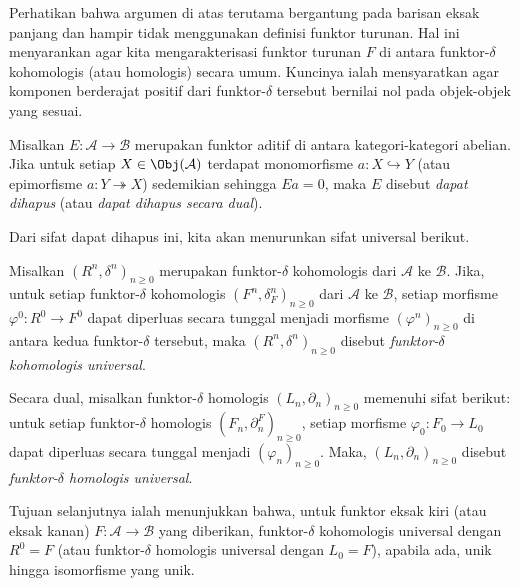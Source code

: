 Perhatikan bahwa argumen di atas terutama bergantung pada barisan eksak panjang dan hampir tidak menggunakan definisi funktor turunan. Hal ini menyarankan agar kita mengarakterisasi funktor turunan $F$ di antara funktor-$\delta$ kohomologis (atau homologis) secara umum. Kuncinya ialah mensyaratkan agar komponen berderajat positif dari funktor-$\delta$ tersebut bernilai nol pada objek-objek yang sesuai.

\begin{definisi}[A.\ Grothendieck]\label{def:erasable}
	Misalkan $E: \mathcal{A} \to \mathcal{B}$ merupakan funktor aditif di antara kategori-kategori abelian. Jika untuk setiap $X \in \Obj(\mathcal{A})$ terdapat monomorfisme $a: X \hookrightarrow Y$ (atau epimorfisme $a: Y \twoheadrightarrow X$) sedemikian sehingga $Ea = 0$, maka $E$ disebut \emph{dapat dihapus} (atau \emph{dapat dihapus secara dual}).
\end{definisi}

Dari sifat dapat dihapus ini, kita akan menurunkan sifat universal berikut.

\begin{definisi}\label{def:universal-delta-functor}
	Misalkan $(R^n, \delta^n)_{n \geq 0}$ merupakan funktor-$\delta$ kohomologis dari $\mathcal{A}$ ke $\mathcal{B}$. Jika, untuk setiap funktor-$\delta$ kohomologis $(F^n, \delta_F^n)_{n \geq 0}$ dari $\mathcal{A}$ ke $\mathcal{B}$, setiap morfisme $\varphi^0: R^0 \to F^0$ dapat diperluas secara tunggal menjadi morfisme $(\varphi^n)_{n \geq 0}$ di antara kedua funktor-$\delta$ tersebut, maka $(R^n, \delta^n)_{n \geq 0}$ disebut \emph{funktor-$\delta$ kohomologis universal}.
	
	Secara dual, misalkan funktor-$\delta$ homologis $(L_n, \partial_n)_{n \geq 0}$ memenuhi sifat berikut: untuk setiap funktor-$\delta$ homologis $(F_n, \partial^F_n)_{n \geq 0}$, setiap morfisme $\varphi_0: F_0 \to L_0$ dapat diperluas secara tunggal menjadi $(\varphi_n)_{n \geq 0}$. Maka, $(L_n, \partial_n)_{n \geq 0}$ disebut \emph{funktor-$\delta$ homologis universal}.
\end{definisi}

Tujuan selanjutnya ialah menunjukkan bahwa, untuk funktor eksak kiri (atau eksak kanan) $F: \mathcal{A} \to \mathcal{B}$ yang diberikan, funktor-$\delta$ kohomologis universal dengan $R^0 = F$ (atau funktor-$\delta$ homologis universal dengan $L_0 = F$), apabila ada, unik hingga isomorfisme yang unik.

